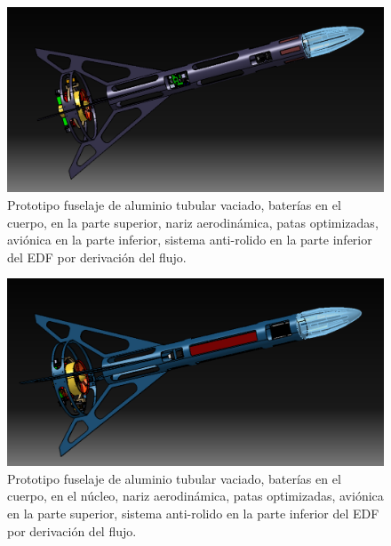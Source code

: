 \begin{figure}[htb]
    \centering
    \includegraphics[width=\linewidth]{fig/design/4}
    \caption{Prototipo fuselaje de aluminio tubular vaciado, baterías en el cuerpo, en la parte superior, nariz
    aerodinámica, patas optimizadas, aviónica en la parte inferior, sistema anti-rolido en la parte
    inferior del EDF por derivación del flujo.}
    \label{fig:design/4}
\end{figure}


\begin{figure}[htb]
    \centering
    \includegraphics[width=\linewidth]{fig/design/5}
    \caption{Prototipo fuselaje de aluminio tubular vaciado, baterías en el cuerpo, en el núcleo, nariz aerodinámica, patas optimizadas, aviónica en la parte superior, sistema anti-rolido en la parte
    inferior del EDF por derivación del flujo.}
    \label{fig:design/5}
\end{figure}

\null\newpage
\clearpage

